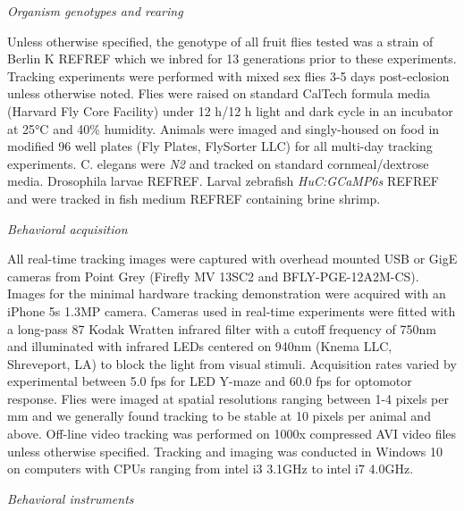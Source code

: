 \documentclass[10pt]{article}
\begin{document}
\begin{multicols}{2}
\vspace*{0.5cm}
\noindent\textit{Organism genotypes and rearing}
\vspace*{0.3cm}

Unless otherwise specified, the genotype of all fruit flies tested was a strain of Berlin K REFREF which we inbred for 13 generations prior to these experiments. Tracking experiments were performed with mixed sex flies 3-5 days post-eclosion unless otherwise noted. Flies were raised on standard CalTech formula media (Harvard Fly Core Facility) under 12 h/12 h light and dark cycle in an incubator at 25°C and 40\% humidity. Animals were imaged and singly-housed on food in modified 96 well plates (Fly Plates, FlySorter LLC) for all multi-day tracking experiments. C. elegans were \textit{N2} and tracked on standard cornmeal/dextrose media. Drosophila larvae REFREF. Larval zebrafish \textit{HuC:GCaMP6s} REFREF and were tracked in fish medium REFREF containing brine shrimp.

\vspace*{0.5cm}
\noindent\textit{Behavioral acquisition}
\vspace*{0.3cm}

All real-time tracking images were captured with overhead mounted USB or GigE cameras from Point Grey (Firefly MV 13SC2 and BFLY-PGE-12A2M-CS). Images for the minimal hardware tracking demonstration were acquired with an iPhone 5s 1.3MP camera. Cameras used in real-time experiments were fitted with a long-pass 87 Kodak Wratten infrared filter with a cutoff frequency of 750nm and illuminated with infrared LEDs centered on 940nm (Knema LLC, Shreveport, LA) to block the light from visual stimuli. Acquisition rates varied by experimental between 5.0 fps for LED Y-maze and 60.0 fps for optomotor response. Flies were imaged at spatial resolutions ranging between 1-4 pixels per mm and we generally found tracking to be stable at 10 pixels per animal and above.  Off-line video tracking was performed on 1000x compressed AVI video files unless otherwise specified. Tracking and imaging was conducted in Windows 10 on computers with CPUs ranging from intel i3 3.1GHz to intel i7 4.0GHz. 

\vspace*{0.5cm}
\noindent\textit{Behavioral instruments}
\vspace*{0.3cm}


\end{multicols}
\end{document}
